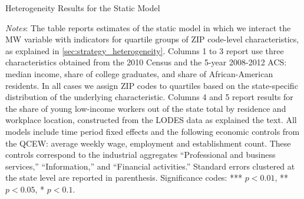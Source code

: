 \begin{table}[h!]
	\caption{Heterogeneity Results for the Static Model}
	\label{tab:fd_model_het}
	\centering
	\resizebox{\textwidth}{!}{
		}
	\begin{minipage}{0.95\textwidth} \footnotesize
		\vspace{3mm}
		\textit{Notes}: The table reports estimates of the static model in which we interact 
		the MW variable with indicators for quartile groups of ZIP code-level characteristics, 
		as explained in \autoref{sec:strategy_heterogeneity}. Columns 1 to 3 report use three 
		characteristics obtained from the 2010 Census and the 5-year 2008-2012 ACS: median 
		income, share of college graduates, and share of African-American residents. In all 
		cases we assign ZIP codes to quartiles based on the state-specific distribution of the 
		underlying characteristic. Columns 4 and 5 report results for the share of young 
		low-income workers out of the state total by residence and workplace location, 
		constructed from the LODES data as explained the text. All models include time period 
		fixed effects and the following economic controls from the QCEW: average
		weekly wage, employment and establishment count. These controls correspond to the 
		industrial aggregates ``Professional and business services,'' ``Information,'' and 
		``Financial activities.''
		Standard errors clustered at the state level are reported in parenthesis. Significance 
		codes: *** $p < 0.01$, ** $p < 0.05$, * $p < 0.1$.
	\end{minipage}
\end{table}





